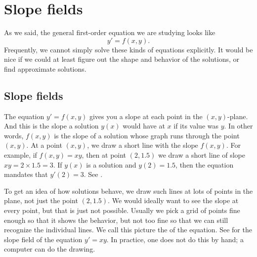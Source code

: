 
\sectionnewpage
\section{Slope fields}
\label{slopefields:section}



%

As we said, the general first-order equation we are studying looks like
\begin{equation*}
y' = f(x,y).
\end{equation*}
Frequently, we cannot simply solve these kinds of equations explicitly.
It would be nice if we could at least figure out the shape and behavior of
the solutions, or find approximate solutions.

\subsection{Slope fields}

The equation $y' = f(x,y)$
gives you a slope at each point
in the
$(x,y)$-plane.  And this is the slope a solution $y(x)$ would have
at $x$ if its value was $y$.  In other words, $f(x,y)$ is the slope
of a solution whose graph runs through the
point $(x,y)$.  At a point $(x,y)$, we draw a short line
with the slope $f(x,y)$.
For example, if $f(x,y) = xy$, then at point $(2,1.5)$ we draw a
short line of slope $xy = 2 \times 1.5 = 3$.  If $y(x)$ is a solution
and $y(2) = 1.5$, then the equation mandates that $y'(2) = 3$.
See .

\begin{myfig}
\capstart
{}
\caption{The slope $y'=xy$ at $(2,1.5)$.\label{1.3:fig0}}
\end{myfig}

To get an idea of how solutions behave, we draw such lines at lots
of points in the plane, not just the point $(2,1.5)$.  We would
ideally want to see the slope at every point, but that is
just not possible.  Usually we pick a
grid of points fine enough so that it shows the behavior, but not too
fine so that we can still recognize the individual lines.
We call this picture the \emph{} of the equation.
See  for the slope field of the equation $y' = xy$.
In practice, one does not do this by hand; a computer can do the
drawing.

